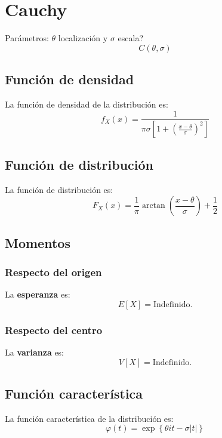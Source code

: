 \section{Cauchy}
\label{sec:cauchy}
Parámetros: $\theta$ localización y $\sigma$ escala?
\[
\boxed{C\left( \theta, \sigma \right)}
\]

\subsection{Función de densidad}
La función de densidad de la distribución es:
\[
f_X \left( x \right) = \frac{1}{\pi \sigma \left[ 1 + \left( \frac{x - \theta}{\sigma} \right)^2 \right]}
\]

\subsection{Función de distribución}
La función de distribución es:
\[
F_X\left( x \right) = \frac{1}{\pi} \arctan \left( \frac{x - \theta}{\sigma} \right) + \frac{1}{2}
\]

\subsection{Momentos}

\subsubsection*{Respecto del origen}
La \textbf{esperanza} es: 
\[
    E\left[ X \right] = \text{Indefinido.}
\]
\subsubsection*{Respecto del centro}
La \textbf{varianza} es:
\[
    V\left[ X \right] = \text{Indefinido.} 
\]

\subsection{Función característica}
La función característica de la distribución es:
\[
\varphi\left( t \right) = \exp\left\{ \theta i t - \sigma \lvert t \rvert \right\}
\]

